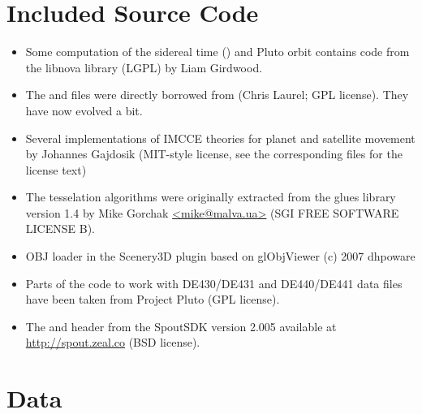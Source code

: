 \section{Included Source Code}
\label{sec:ack:code}

\begin{itemize}		
  \item Some computation of the sidereal time () and Pluto
      orbit contains code from the libnova library (LGPL) by Liam Girdwood.
  \item The  and  files were directly borrowed from
       (Chris Laurel; GPL license). They have now evolved a bit.
  \item Several implementations of IMCCE theories for planet and satellite movement by Johannes Gajdosik 
       (MIT-style license, see the corresponding files for the license text)
  \item The tesselation algorithms were originally extracted from the glues 
      library version 1.4 by Mike Gorchak \url{<mike@malva.ua>} (SGI FREE SOFTWARE LICENSE B).
  \item OBJ loader in the Scenery3D plugin based on glObjViewer (c) 2007 dhpoware
  \item Parts of the code to work with DE430/DE431 and DE440/DE441 data files have been taken from Project Pluto (GPL license).
  \item The  and header from the SpoutSDK version 2.005 available at \url{http://spout.zeal.co} (BSD license).
\end{itemize}

\section{Data}
\label{sec:ack:data}

